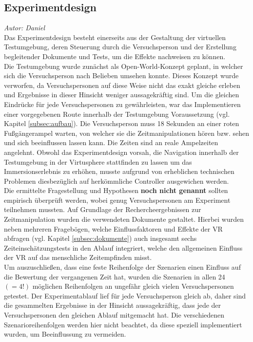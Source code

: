 \documentclass{Bericht}
\begin{document}
\subsection{Experimentdesign}
\textit{Autor: Daniel}\\
Das Experimentdesign besteht einerseits aus der Gestaltung der virtuellen Testumgebung, deren Steuerung durch die Versuchsperson und der Erstellung begleitender Dokumente und Tests, um die Effekte nachweisen zu können.\\
Die Testumgebung wurde zunächst als Open-World-Konzept geplant, in welcher sich die Versuchsperson nach Belieben umsehen konnte. Dieses Konzept wurde verworfen, da Versuchspersonen auf diese Weise nicht das exakt gleiche erleben und Ergebnisse in dieser Hinsicht weniger aussagekräftig sind. Um die gleichen Eindrücke für jede Versuchspersonen zu gewährleisten, war das Implementieren einer vorgegebenen Route innerhalb der Testumgebung Voraussetzung (vgl. Kapitel \ref{subsec:aufbau}). Die Versuchsperson muss 18 Sekunden an einer roten Fußgängerampel warten, von welcher sie die Zeitmanipulationen hören bzw. sehen und sich beeinflussen lassen kann. Die Zeiten sind an reale Ampelzeiten angelehnt.
	Obwohl das Experimentdesign vorsah, die Navigation innerhalb der Testumgebung in der Virtusphere stattfinden zu lassen um das Immersionserlebnis zu erhöhen, musste aufgrund von erheblichen technischen Problemen diesbezüglich auf herkömmliche Controller ausgewichen werden.\\
	Die ermittelte Fragestellung und Hypothesen \textbf{noch nicht genannt} sollten empirisch überprüft werden, wobei genug Versuchspersonen am Experiment teilnehmen mussten.
Auf Grundlage der Rechercheergebnissen zur  Zeitmanipulation wurden die verwendeten Dokumente gestaltet. Hierbei wurden neben mehreren Fragebögen, welche Einflussfaktoren und Effekte der VR abfragen		 (vgl. Kapitel \ref{subsec:dokumente}) auch insgesamt sechs Zeiteinschätzungstests in den Ablauf integriert, welche den allgemeinen Einfluss der VR auf das menschliche Zeitempfinden misst.\\
Um auszuschließen, dass eine feste Reihenfolge der Szenarien einen Einfluss auf die Bewertung der vergangenen Zeit hat, wurden die Szenarien in allen 24 $(= 4!)$ möglichen Reihenfolgen an ungefähr gleich vielen Versuchspersonen getestet. Der Experimentablauf lief für jede Versuchsperson gleich ab, daher sind die gesammelten Ergebnisse in der Hinsicht aussagekräftig, dass jede der Versuchspersonen den gleichen Ablauf mitgemacht hat. Die verschiedenen Szenarioreihenfolgen werden hier nicht beachtet, da diese speziell implementiert wurden, um Beeinflussung zu vermeiden.
	
\end{document}
